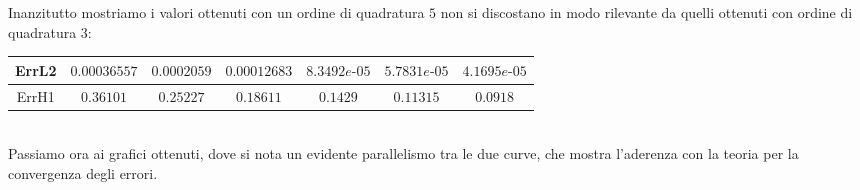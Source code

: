 \documentclass[12pt,a4paper]{report}
\theoremstyle{theorem}
\theoremstyle{theorem}
\theoremstyle{definition}
\begin{document}
Inanzitutto mostriamo i valori ottenuti con un ordine di quadratura $5$ non si discostano in modo rilevante da quelli ottenuti con ordine di quadratura $3$:
\begin{table}[!h]
\centering
\begin{tabular}{ | c | c | c | c | c | c | c | }
\hline
ErrL2 &	$0.00036557$ & $0.0002059$ & $0.00012683$ & $8.3492e\text{-}05$  & $5.7831e\text{-}05$ & $4.1695e\text{-}05$ \\ \hline 
ErrH1	&	$0.36101$ &	$0.25227$	 & $0.18611$	 & $0.1429$ & $0.11315$ & $0.0918$ \\ \hline 
\end{tabular}
\end{table}
\hfill \\
Passiamo ora ai grafici ottenuti, dove si nota un evidente parallelismo tra le due curve, che mostra l'aderenza con la teoria per la convergenza degli errori.
\end{document}
